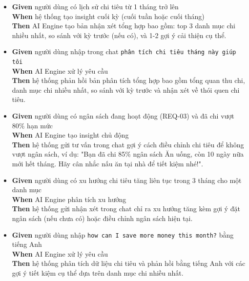 \begin{itemize}
\item \textbf{Given} người dùng có lịch sử chi tiêu từ 1 tháng trở lên  \\ \hspace*{1.5em}  \textbf{When} hệ thống tạo insight cuối kỳ (cuối tuần hoặc cuối tháng)  \\ \hspace*{1.5em}  \textbf{Then} AI Engine tạo bản nhận xét tổng hợp bao gồm: top 3 danh mục chi nhiều nhất, so sánh với kỳ trước (nếu có), và 1-2 gợi ý cải thiện cụ thể.
\item \textbf{Given} người dùng nhập trong chat \texttt{phân tích chi tiêu tháng này giúp tôi}  \\ \hspace*{1.5em}  \textbf{When} AI Engine xử lý yêu cầu  \\ \hspace*{1.5em}  \textbf{Then} hệ thống phản hồi bản phân tích tổng hợp bao gồm tổng quan thu chi, danh mục chi nhiều nhất, so sánh với kỳ trước và nhận xét về thói quen chi tiêu.
\item \textbf{Given} người dùng có ngân sách đang hoạt động (REQ-03) và đã chi vượt 80\% hạn mức  \\ \hspace*{1.5em}  \textbf{When} AI Engine tạo insight chủ động  \\ \hspace*{1.5em}  \textbf{Then} hệ thống gửi tư vấn trong chat gợi ý cách điều chỉnh chi tiêu để không vượt ngân sách, ví dụ: "Bạn đã chi 85\% ngân sách Ăn uống, còn 10 ngày nữa mới hết tháng. Hãy cân nhắc nấu ăn tại nhà để tiết kiệm nhé!".
\item \textbf{Given} người dùng có xu hướng chi tiêu tăng liên tục trong 3 tháng cho một danh mục  \\ \hspace*{1.5em}  \textbf{When} AI Engine phân tích xu hướng  \\ \hspace*{1.5em}  \textbf{Then} hệ thống gửi nhận xét trong chat chỉ ra xu hướng tăng kèm gợi ý đặt ngân sách (nếu chưa có) hoặc điều chỉnh ngân sách hiện tại.
\item \textbf{Given} người dùng nhập \texttt{how can I save more money this month?} bằng tiếng Anh  \\ \hspace*{1.5em}  \textbf{When} AI Engine xử lý yêu cầu  \\ \hspace*{1.5em}  \textbf{Then} hệ thống phân tích dữ liệu chi tiêu và phản hồi bằng tiếng Anh với các gợi ý tiết kiệm cụ thể dựa trên danh mục chi nhiều nhất.

\end{itemize}
